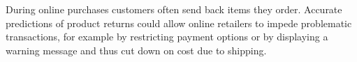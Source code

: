 During online purchases customers often send back items they order. Accurate predictions of product returns could allow online retailers to impede problematic transactions, for example by restricting payment options or by displaying a warning message and thus cut down on cost due to shipping. 
